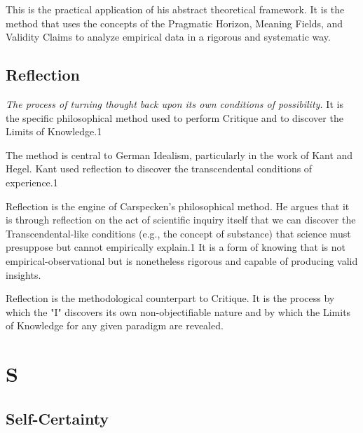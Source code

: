 \documentclass{book}
\begin{document}
This is the practical application of his abstract theoretical framework. It is the method that uses the concepts of the Pragmatic Horizon, Meaning Fields, and Validity Claims to analyze empirical data in a rigorous and systematic way.

\parencite{Carspecken1995aa}


\section{Reflection}

\textit{The process of turning thought back upon its own conditions of possibility.} It is the specific philosophical method used to perform Critique and to discover the Limits of Knowledge.1

The method is central to German Idealism, particularly in the work of Kant and Hegel. Kant used reflection to discover the transcendental conditions of experience.1

Reflection is the engine of Carspecken's philosophical method. He argues that it is through reflection on the act of scientific inquiry itself that we can discover the Transcendental-like conditions (e.g., the concept of substance) that science must presuppose but cannot empirically explain.1 It is a form of knowing that is not empirical-observational but is nonetheless rigorous and capable of producing valid insights.

Reflection is the methodological counterpart to Critique. It is the process by which the "I" discovers its own non-objectifiable nature and by which the Limits of Knowledge for any given paradigm are revealed.

\parencite{Carspecken2016}

\chapter{S}

\section{Self-Certainty}
\end{document}
